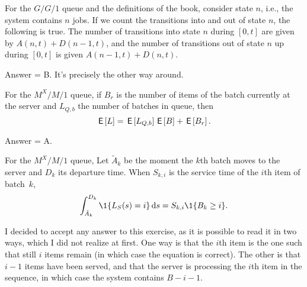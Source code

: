 \begin{exercise}[201804]
For the $G/G/1$ queue and the definitions of the book, consider state $n$, i.e., the system contains $n$ jobs. If we count the transitions into and out of state $n$, the following is true. The number of transitions into state $n$ during $[0,t]$ are given by $A(n,t) + D(n-1,t)$, and the number of transitions out of state $n$ up during $[0,t]$ is given $A(n-1,t) + D(n,t)$.
\begin{solution}
Answer = B. It's precisely the other way around. 
\end{solution}
\end{exercise}

\begin{exercise}[201804]
For the $M^X/M/1$ queue, if $B_r$ is the number of items of the batch currently at the server and $L_{Q,b}$ the number of batches in queue, then
\begin{equation*}
 \,\mathsf{E}\left[L\right] = \,\mathsf{E}\left[L_{Q,b}\right]\,\mathsf{E}\left[B\right] + \,\mathsf{E}\left[B_r\right].
\end{equation*}
\begin{solution}
Answer = A.
\end{solution}
\end{exercise}

\begin{exercise}[201804]
For the $M^X/M/1$ queue, 
Let $\tilde A_k$ be the moment the $k$th batch moves to the server and $D_k$ its departure time. When $S_{k,i}$ is the service time of the $i$th item of batch~$k$, 
\begin{equation*}
 \int_{\tilde A_k}^{D_k} \1{L_S(s)=i} \d s = S_{k,i} \1{B_k \geq i}.
\end{equation*}
\begin{solution}
I decided to accept any answer to this exercise, as it is possible to read it in two ways, which I did not realize at first. One way is that the $i$th item is the one such that still $i$ items remain (in which case the equation is correct). The other is that $i-1$ items have been served, and that the server is processing the $i$th item in the sequence, in which case the system contains $B-i-1$. 
\end{solution}
\end{exercise}

